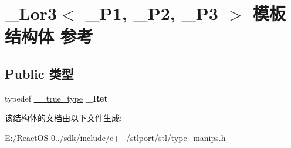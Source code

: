 \hypertarget{struct___lor3}{}\section{\+\_\+\+Lor3$<$ \+\_\+\+P1, \+\_\+\+P2, \+\_\+\+P3 $>$ 模板结构体 参考}
\label{struct___lor3}
\subsection*{Public 类型}
\begin{DoxyCompactItemize}
\item 
\mbox{\label{struct___lor3_a7177bddfb2a5c8bae29b114c8b802389}} 
typedef \hyperlink{struct____true__type}{\+\_\+\+\_\+true\+\_\+type} {\bfseries \+\_\+\+Ret}
\end{DoxyCompactItemize}


该结构体的文档由以下文件生成\+:\begin{DoxyCompactItemize}
\item 
E\+:/\+React\+O\+S-\/0../sdk/include/c++/stlport/stl/type\+\_\+manips.\+h\end{DoxyCompactItemize}
